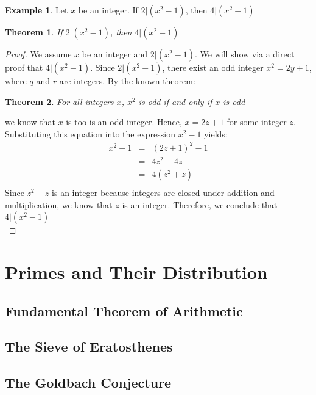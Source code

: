 \documentclass{book}
\newtheorem{theorem}{Theorem}[section]
\theoremstyle{definition}
\newtheorem{example}{Example}[definition]
\theoremstyle{remark}
\begin{document}
\begin{example}
Let $x$ be an integer. If $2 | (x^2 - 1)$, then $4 | (x^2 - 1)$ \\

\begin{tcolorbox}
	\begin{theorem}
		If $2 | (x^2 - 1)$, then $4 | (x^2 - 1)$
	\end{theorem}
\end{tcolorbox}

\begin{proof}
We assume $x$ be an integer and $2 | (x^2 - 1)$. We will show via a direct proof that $4 | (x^2 - 1)$. Since $2 | (x^2 - 1)$, there exist an odd integer $x^2 = 2y + 1$, where $q$ and $r$ are integers. By the known theorem: 
	\begin{theorem}
	\label{oddsquaretheory}		
		For all integers $x$, $x^2$ is odd if and only if $x$ is odd
	\end{theorem}
we know that $x$ is too is an odd integer. Hence, $x = 2z + 1$ for some integer $z$. Substituting this equation into the expression $x^2 - 1$ yields:
\begin{eqnarray*}
	x^2 - 1 & = & (2z + 1)^2 - 1 \nonumber \\	
	& = & 4z^2 + 4z \nonumber \\	
	& = & 4(z^2 + z) \nonumber \\	
\end{eqnarray*}
Since $z^2 + z$ is an integer because integers are closed under addition  and multiplication, we know that $z$ is an integer. Therefore, we conclude that $4 | (x^2 - 1)$ \\
\end{proof}
\end{example}



\newpage
\section{Primes and Their Distribution}
\subsection{Fundamental Theorem of Arithmetic}
\subsection{The Sieve of Eratosthenes}
\subsection{The Goldbach Conjecture}
\end{document}
